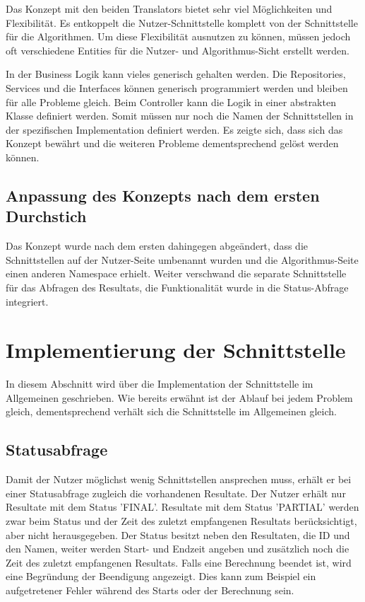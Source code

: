 Das Konzept mit den beiden Translators bietet sehr viel Möglichkeiten und Flexibilität. Es entkoppelt die Nutzer-Schnittstelle komplett von der Schnittstelle für die Algorithmen. Um diese 
Flexibilität ausnutzen zu können, müssen jedoch oft verschiedene Entities für die Nutzer- und Algorithmus-Sicht erstellt werden.

In der Business Logik kann vieles generisch gehalten werden. Die Repositories, Services und die Interfaces können generisch programmiert werden und bleiben für alle Probleme gleich. Beim 
Controller kann die Logik in einer abstrakten Klasse definiert werden. Somit müssen nur noch die Namen der Schnittstellen in der spezifischen Implementation definiert werden. Es zeigte sich, 
dass sich das Konzept bewährt und die weiteren Probleme dementsprechend gelöst werden können.

\subsection{Anpassung des Konzepts nach dem ersten Durchstich}\label{doings_prototyp}
Das Konzept wurde nach dem ersten  dahingegen abgeändert, dass die Schnittstellen auf der Nutzer-Seite umbenannt wurden und die 
Algorithmus-Seite einen anderen Namespace erhielt. Weiter verschwand die separate Schnittstelle für das Abfragen des Resultats, die Funktionalität wurde in die Status-Abfrage integriert.

\section{Implementierung der Schnittstelle}\label{impl_interface}
In diesem Abschnitt wird über die Implementation der Schnittstelle im Allgemeinen geschrieben. Wie bereits erwähnt ist der Ablauf bei jedem Problem gleich, dementsprechend verhält sich die 
Schnittstelle im Allgemeinen gleich.

\subsection{Statusabfrage}
Damit der Nutzer möglichst wenig Schnittstellen ansprechen muss, erhält er bei einer Statusabfrage zugleich die vorhandenen Resultate. Der Nutzer erhält nur Resultate mit dem Status 'FINAL'. 
Resultate mit dem Status 'PARTIAL' werden zwar beim Status und der Zeit des zuletzt empfangenen Resultats berücksichtigt, aber nicht herausgegeben. Der Status besitzt neben den 
Resultaten, die ID und den Namen, weiter werden Start- und Endzeit angeben und zusätzlich noch die Zeit des zuletzt empfangenen Resultats. Falls eine Berechnung beendet ist, wird eine 
Begründung der Beendigung angezeigt. Dies kann zum Beispiel ein aufgetretener Fehler während des Starts oder der Berechnung sein.

